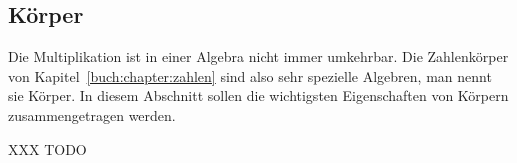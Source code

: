 %
%
%
\subsection{Körper
\label{buch:subsection:koerper}}
Die Multiplikation ist in einer Algebra nicht immer umkehrbar.
Die Zahlenkörper von Kapitel~\ref{buch:chapter:zahlen} sind also
sehr spezielle Algebren, man nennt sie Körper.
In diesem Abschnitt sollen die wichtigsten Eigenschaften von Körpern
zusammengetragen werden.


XXX TODO





